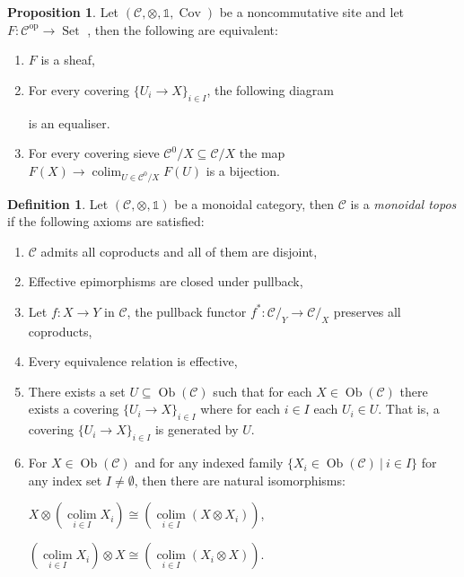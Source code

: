 \documentclass[8pt]{article}
\theoremstyle{definition}
\newtheorem{definition}{Definition}[section]
\theoremstyle{definition}
\theoremstyle{definition}
\theoremstyle{definition}
\theoremstyle{definition}
\theoremstyle{definition}
\theoremstyle{definition}
\newtheorem{prop}{Proposition}[section]
\theoremstyle{definition}
\theoremstyle{definition}
\theoremstyle{definition}
\theoremstyle{definition}
\theoremstyle{definition}
\theoremstyle{definition}
\theoremstyle{question}
\DeclareMathOperator*{\colim}{\operatorname{colim}}
\newcommand{\Ob}[1]{\operatorname{Ob}({\mathcal{#1}})}
\begin{document}
\begin{prop}
  Let $(\mathcal{C}, \otimes, \mathds{1}, \operatorname{Cov})$ be a noncommutative site and
  let $F : \mathcal{C}^{\operatorname{op}} \to \operatorname{Set}$ , then the following are
  equivalent:
  \begin{enumerate}
    \item $F$ is a sheaf,
    \item For every covering $\{ U_i \to X \}_{i \in I}$, the following diagram

    \centerline{
    }
    is an equaliser.
    \item For every covering sieve $\mathcal{C}^{0}/X \subseteq \mathcal{C}/X$
    the map $F(X) \to \colim_{U \in \mathcal{C}^{0}/X} F(U)$ is a bijection.
  \end{enumerate}
\end{prop}

\begin{definition}
  Let $(\mathcal{C}, \otimes, \mathds{1})$ be a monoidal category, then $\mathcal{C}$
  is a \emph{monoidal topos} if the following axioms are satisfied:
  \begin{enumerate}
    \item $\mathcal{C}$ admits all coproducts and all of them are disjoint,
    \item Effective epimorphisms are closed under pullback,
    \item Let $f : X \to Y$ in $\mathcal{C}$, the pullback functor
    $f^* : \mathcal{C}/_Y \to \mathcal{C}/_X$ preserves all coproducts,
    \item Every equivalence relation is effective,
    \item There exists a set $U \subseteq \Ob{C}$ such that
    for each $X \in \Ob{C}$ there exists a covering
    $\{ U_i \to X \}_{i \in I}$
    where for each $i \in I$ each $U_i \in U$. That is, a covering $\{ U_i \to X \}_{i \in I}$
    is generated by $U$.
    \item For $X \in \Ob{C}$ and for any indexed family 
    $\{ X_i \in \Ob{C} \: | \: i \in I \}$ for any index set $I \neq \emptyset$, then 
    there are natural isomorphisms: 
    \begin{center}
    $X \otimes (\colim \limits_{i \in I} X_i) \cong (\colim \limits_{i \in I} (X \otimes X_i))$,

    $(\colim \limits_{i \in I} X_i) \otimes X \cong (\colim \limits_{i \in I} (X_i \otimes X))$.
    \end{center}
  \end{enumerate}
\end{definition}
\end{document}
